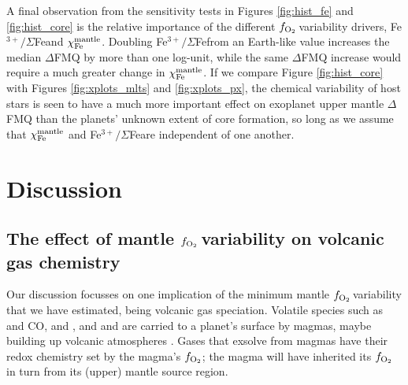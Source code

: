 \documentclass[fleqn,usenatbib,twocolumn]{mnras}
\newcommand{\fo}{$f_{\ce{O2}}$}
\newcommand{\xfer}{Fe$^{3+}/\Sigma$Fe}
\newcommand{\xcore}{Fe$_{\rm mantle}$/(Fe$_{\rm core}$ + Fe$_{\rm mantle}$)}
\newcommand{\todo}[1]{\textit{\textcolor{violet}{{#1}}}}
\begin{document}
A final observation from the sensitivity tests in Figures \ref{fig:hist_fe} and \ref{fig:hist_core} is the relative importance of the different \fo\,variability drivers, \xfer\;and $\chi_{\rm Fe}^{\rm mantle}$. Doubling \xfer\;from an Earth-like value increases the median $\Delta$FMQ by more than one log-unit, while the same $\Delta$FMQ increase would require a much greater change in $\chi_{\rm Fe}^{\rm mantle}$. If we compare Figure \ref{fig:hist_core} with Figures \ref{fig:xplots_mlts} and \ref{fig:xplots_px}, the chemical variability of host stars is seen to have a much more important effect on exoplanet upper mantle $\Delta$FMQ than the planets' unknown extent of core formation, so long as we assume that $\chi_{\rm Fe}^{\rm mantle}$ and \xfer\;are independent of one another.






\section{Discussion}
\label{sec:discussion}


\subsection{The effect of mantle \fo\,variability on volcanic gas chemistry}


Our discussion focusses on one implication of the minimum mantle \fo\,variability that we have estimated, being volcanic gas speciation. Volatile species such as  and CO,  and , and  and  are carried to a planet's surface by magmas, maybe building up volcanic atmospheres \citep[e.g.,][]{gaillard_theoretical_2014,liggins_growth_2022}. Gases that exsolve from magmas have their redox chemistry set by the magma's \fo; the magma will have inherited its \fo\,in turn from its (upper) mantle source region.
\end{document}
